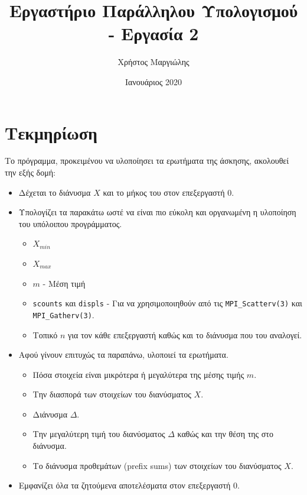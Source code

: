 \documentclass{article}
\title{Εργαστήριο Παράλληλου Υπολογισμού - Εργασία 2}
\author{Χρήστος Μαργιώλης}
\date{Ιανουάριος 2020}
\begin{document}
\begin{titlepage}
        \maketitle
\end{titlepage}

\renewcommand{\contentsname}{Περιεχόμενα}
\tableofcontents

\section{Τεκμηρίωση}

Το πρόγραμμα, προκειμένου να υλοποίησει τα ερωτήματα της άσκησης,
ακολουθεί την εξής δομή:
\begin{itemize}
        \item Δέχεται το διάνυσμα $X$ και το μήκος του στον επεξεργαστή 0.
        \item Υπολογίζει τα παρακάτω ωστέ να είναι πιο
                εύκολη και οργανωμένη η υλοποίηση του υπόλοιπου
                προγράμματος.
        \begin{itemize}
                \item $X_{min}$
                \item $X_{max}$
                \item $m$ - Μέση τιμή
                \item \lstinline{scounts} και \lstinline{displs} - Για να
                χρησιμοποιηθούν από τις \lstinline{MPI_Scatterv(3)}
                και \lstinline{MPI_Gatherv(3)}.
                \item Τοπικό $n$ για τον κάθε επεξεργαστή καθώς και το
                διάνυσμα που του αναλογεί.
        \end{itemize}
        \item Αφού γίνουν επιτυχώς τα παραπάνω, υλοποιεί τα ερωτήματα.
        \begin{itemize}
                \item Πόσα στοιχεία είναι μικρότερα ή μεγαλύτερα της μέσης τιμής $m$.
                \item Την διασπορά των στοιχείων του διανύσματος $X$.
                \item Διάνυσμα $Δ$.
                \item Την μεγαλύτερη τιμή του διανύσματος $Δ$ καθώς και την 
                θέση της στο διάνυσμα.
                \item Το διάνυσμα προθεμάτων (prefix sums) των στοιχείων
                του διανύσματος $X$.
        \end{itemize}
        \item Εμφανίζει όλα τα ζητούμενα αποτελέσματα στον επεξεργαστή 0.
\end{itemize}
\end{document}
